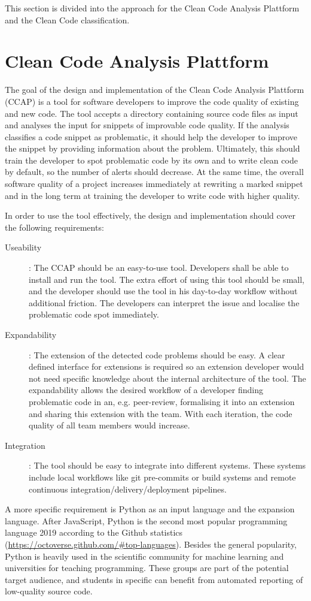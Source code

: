 This section is divided into the approach for the Clean Code Analysis Plattform and the Clean Code classification.

\section{Clean Code Analysis Plattform}
The goal of the design and implementation of the Clean Code Analysis Plattform (CCAP) is a tool for software developers to improve the code quality of existing and new code. The tool accepts a directory containing source code files as input and analyses the input for snippets of improvable code quality. If the analysis classifies a code snippet as problematic, it should help the developer to improve the snippet by providing information about the problem. Ultimately, this should train the developer to spot problematic code by its own and to write clean code by default, so the number of alerts should decrease. At the same time, the overall software quality of a project increases immediately at rewriting a marked snippet and in the long term at training the developer to write code with higher quality.

In order to use the tool effectively, the design and implementation should cover the following requirements:
\begin{description}
    \item[Useability]:  The CCAP should be an easy-to-use tool. Developers shall be able to install and run the tool. The extra effort of using this tool should be small, and the developer should use the tool in his day-to-day workflow without additional friction. The developers can interpret the issue and localise the problematic code spot immediately.
    \item[Expandability]: The extension of the detected code problems should be easy. A clear defined interface for extensions is required so an extension developer would not need specific knowledge about the internal architecture of the tool. The expandability allows the desired workflow of a developer finding problematic code in an, e.g. peer-review, formalising it into an extension and sharing this extension with the team. With each iteration, the code quality of all team members would increase.
    \item[Integration]: The tool should be easy to integrate into different systems. These systems include local workflows like git pre-commits or build systems and remote continuous integration/delivery/deployment pipelines.
\end{description}
A more specific requirement is Python as an input language and the expansion language. After JavaScript, Python is the second most popular programming language 2019 according to the Github statistics (\url{https://octoverse.github.com/#top-languages}). Besides the general popularity, Python is heavily used in the scientific community for machine learning and universities for teaching programming. These groups are part of the potential target audience, and students in specific can benefit from automated reporting of low-quality source code.

